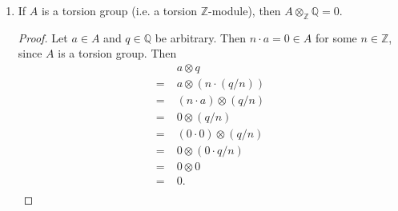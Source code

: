 \documentclass{article}
\begin{document}
\begin{enumerate}[label={(\alph*)}]
\begin{proof}
      \end{proof}

    \item If $A$ is a torsion group (i.e. a torsion $\mathbb{Z}$-module),
      then $A\otimes_\mathbb{Z}\mathbb{Q}=0$.
      \begin{proof}
        Let $a\in A$ and $q\in\mathbb{Q}$ be arbitrary. Then $n\cdot a=0\in
        A$ for some $n\in\mathbb{Z}$, since $A$ is a torsion group. Then
        \begin{align*}
          &\;a\otimes q\\
          =&\;a\otimes(n\cdot(q/n))\\
          =&\;(n\cdot a)\otimes(q/n)\\
          =&\;0\otimes(q/n)\\
          =&\;(0\cdot0)\otimes(q/n)\\
          =&\;0\otimes(0\cdot q/n)\\
          =&\;0\otimes0\\
          =&\;0.\\
        \end{align*}
      \end{proof}
  \end{enumerate}
\end{document}
